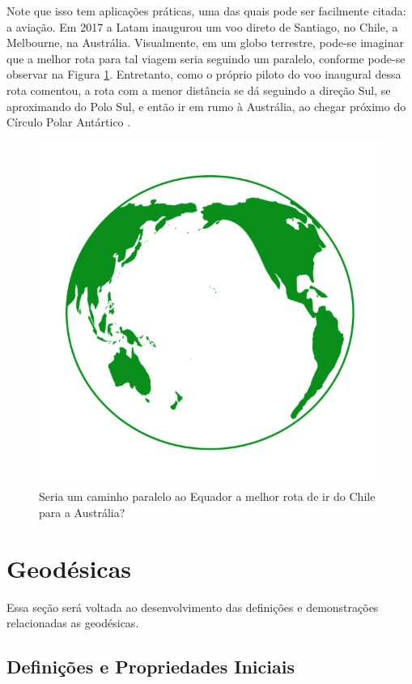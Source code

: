 \documentclass{article}
\begin{document}
Note que isso tem aplicações práticas, uma das quais pode ser facilmente citada: a aviação. Em 2017 a Latam inaugurou um voo direto de Santiago, no Chile, a Melbourne, na Austrália. Visualmente, em um globo terrestre, pode-se imaginar que a melhor rota para tal viagem seria seguindo um paralelo, conforme pode-se observar na Figura \ref{pacific}. Entretanto, como o próprio piloto do voo inaugural dessa rota comentou, a rota com a menor distância se dá seguindo a direção Sul, se aproximando do Polo Sul, e então ir em rumo à Austrália, ao chegar próximo do Círculo Polar Antártico \cite{folha}.
\begin{figure}
    \centering
    \includegraphics[scale = 0.2]{Imagens/pacific ocean.png}
    \caption{Seria um caminho paralelo ao Equador a melhor rota de ir do Chile para a Austrália?}
    \label{pacific}
\end{figure}

\section{Geodésicas}
\label{geodesicas}

Essa seção será voltada ao desenvolvimento das definições e demonstrações relacionadas as geodésicas.

\subsection{Definições e Propriedades Iniciais}
\end{document}

